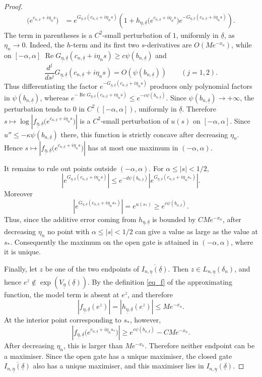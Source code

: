 \documentclass[10pt,a4paper]{amsart}
\newcommand{\Rea}{\operatorname{Re }}
\newcommand{\uldelta}{\underline{\delta}}
\newcommand{\uleta}{\underline{\eta}}
\begin{document}
\begin{proof}
\[\begin{aligned}
		\bigl(e^{c_{n,\uldelta}+i\eta_ns}\bigr)
		&=
		e^{G_{\uleta,\uldelta}(c_{n,\uldelta}+i\eta_ns)}
		\left(
		1+
		h_{\uleta,\uldelta}
		\bigl(e^{c_{n,\uldelta}+i\eta_ns}\bigr)
		e^{-G_{\uleta,\uldelta}(c_{n,\uldelta}+i\eta_ns)}
		\right).
	\end{aligned}
	\]
	The term in parentheses is a \(C^2\)-small perturbation of \(1\), uniformly
	in \(\uldelta\), as \(\eta_n\to0\). Indeed, the \(h\)-term and its first two
	\(s\)-derivatives are \(O(Me^{-x_n})\), while on \([-\alpha,\alpha]\)
	$
	\Rea G_{\uleta,\uldelta}(c_{n,\uldelta}+i\eta_ns)
	\ge
	c\psi(b_{n,\uldelta})
	$
	and
	\[
	\frac{d^j}{ds^j}
	G_{\uleta,\uldelta}(c_{n,\uldelta}+i\eta_ns)
	=
	O(\psi(b_{n,\uldelta}))
	\qquad (j=1,2).
	\]
	Thus differentiating the factor
	\(e^{-G_{\uleta,\uldelta}(c_{n,\uldelta}+i\eta_ns)}\) produces only polynomial
	factors in \(\psi(b_{n,\uldelta})\), whereas
	$
	e^{-\Rea G_{\uleta,\uldelta}(c_{n,\uldelta}+i\eta_ns)}
	\le
	e^{-c\psi(b_{n,\uldelta})}.
	$
	Since \(\psi(b_{n,\uldelta})\to+\infty\), the perturbation tends to \(0\) in
	\(C^2([-\alpha,\alpha])\), uniformly in \(\uldelta\). Therefore
	$
	s\mapsto
	\log\left|
	f_{\uleta,\uldelta}
	\bigl(e^{c_{n,\uldelta}+i\eta_ns}\bigr)
	\right|
	$
	is a \(C^2\)-small perturbation of \(u(s)\) on \([-\alpha,\alpha]\). Since
	\(u''\le-\kappa\psi(b_{n,\uldelta})\) there, this function is strictly
	concave after decreasing \(\eta_n\). Hence
	$
	s\mapsto
	\left|
	f_{\uleta,\uldelta}
	\bigl(e^{c_{n,\uldelta}+i\eta_ns}\bigr)
	\right|
	$
	has at most one maximum in \((-\alpha,\alpha)\).
	
	It remains to rule out points outside \((-\alpha,\alpha)\). For
	\(\alpha\le |s|<1/2\),
	\[
	\left|
	e^{G_{\uleta,\uldelta}(c_{n,\uldelta}+i\eta_ns)}
	\right|
	\le
	e^{-d\psi(b_{n,\uldelta})}
	\left|
	e^{G_{\uleta,\uldelta}(c_{n,\uldelta}+i\eta_ns_*)}
	\right|.
	\]
	Moreover
	\[
	\left|
	e^{G_{\uleta,\uldelta}(c_{n,\uldelta}+i\eta_ns_*)}
	\right|
	=
	e^{u(s_*)}
	\ge
	e^{c\psi(b_{n,\uldelta})}.
	\]
	Thus, since the additive error coming from \(h_{\uleta,\uldelta}\) is bounded
	by \(CMe^{-x_n}\), after decreasing \(\eta_n\) no point with
	\(\alpha\le |s|<1/2\) can give a value as large as the value at \(s_*\).
	Consequently the maximum on the open gate is attained in
	\((-\alpha,\alpha)\), where it is unique.
	
	Finally, let \(z\) be one of the two endpoints of
	\(\overline{I_{n,\uleta}(\uldelta)}\). Then
	\(z\in L_{n,\uleta}(\delta_n)\), and hence
	\(e^z\notin\exp(V_{\uleta}(\uldelta))\). By the definition
	\eqref{eq_f} of the approximating function, the model term is absent at
	\(e^z\), and therefore
	\[
	|f_{\uleta,\uldelta}(e^z)|
	=
	|h_{\uleta,\uldelta}(e^z)|
	\le
	Me^{-x_n}.
	\]
	At the interior point corresponding to \(s_*\), however,
	\[
	\left|
	f_{\uleta,\uldelta}
	\bigl(e^{c_{n,\uldelta}+i\eta_ns_*}\bigr)
	\right|
	\ge
	e^{c\psi(b_{n,\uldelta})}
	-
	CMe^{-x_n}.
	\]
	After decreasing \(\eta_n\), this is larger than \(Me^{-x_n}\). Therefore
	neither endpoint can be a maximiser. Since the open gate has a unique
	maximiser, the closed gate
	\(\overline{I_{n,\uleta}(\uldelta)}\) also has a unique maximiser, and this
	maximiser lies in \(I_{n,\uleta}(\uldelta)\).
	

\end{proof}
\end{document}
